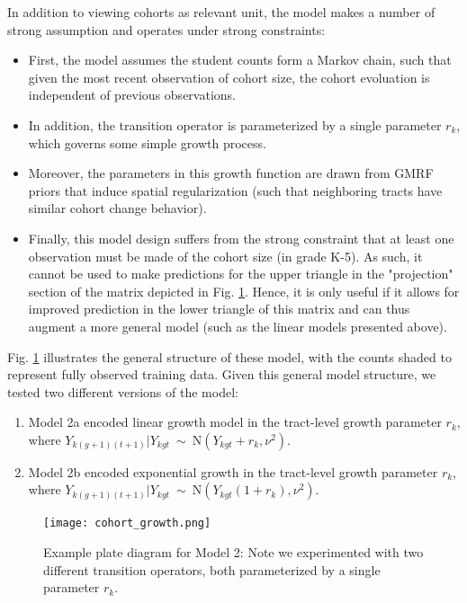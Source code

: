 \documentclass[journal]{IEEEtran}
\begin{document}
In addition to viewing cohorts as relevant unit, the model makes a number of strong assumption and operates under strong constraints:
\begin{itemize}
    \item First, the model assumes the student counts form a Markov chain, such that given the most recent observation of cohort size, the cohort evoluation is independent of previous observations.
    \item In addition, the transition operator is parameterized by a single parameter $r_k$, which governs some simple growth process.
    \item Moreover, the parameters in this growth function are drawn from GMRF priors that induce spatial regularization (such that neighboring tracts have similar cohort change behavior).
    \item Finally, this model design suffers from the strong constraint that at least one observation must be made of the cohort size (in grade K-5). As such, it cannot be used to make predictions for the upper triangle in the "projection" section of the matrix depicted in Fig. \ref{fig:cohort_growth}. Hence, it is only useful if it allows for improved prediction in the lower triangle of this matrix and can thus augment a more general model (such as the linear models presented above).
\end{itemize}

Fig. \ref{fig:cohort_growth} illustrates the general structure of these model, with the  counts shaded to represent fully observed training data. Given this general model structure, we tested two different versions of the model:
\begin{enumerate}
    \item  Model 2a encoded linear growth model in the tract-level growth parameter $r_k$, where \(Y_{k(g+1)(t+1)} | Y_{kgt} ~ \sim ~ \textrm{N}(Y_{kgt} + r_k, \nu^2)\).\\
    \item   Model 2b encoded exponential growth in the tract-level growth parameter $r_k$, where \(Y_{k(g+1)(t+1)}|Y_{kgt}  ~ \sim ~ \textrm{N}(Y_{kgt}(1 + r_k), \nu^2)\).
\end{enumerate}

\begin{figure}[h!]
    \centering
    \texttt{[image: cohort\_growth.png]}
    \caption{Example plate diagram for Model 2: Note we experimented with two different transition operators, both parameterized by a single parameter \(r_k\).}
    \label{fig:cohort_growth}
\end{figure}
\end{document}
